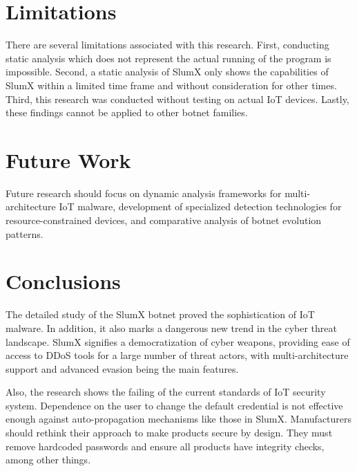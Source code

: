 \documentclass[12pt,letterpaper]{report}
\begin{document}
\section{Limitations}

There are several limitations associated with this research. First, conducting static analysis which does not represent the actual running of the program is impossible. Second, a static analysis of SlumX only shows the capabilities of SlumX within a limited time frame and without consideration for other times. Third, this research was conducted without testing on actual IoT devices. Lastly, these findings cannot be applied to other botnet families.



\section{Future Work}

Future research should focus on dynamic analysis frameworks for multi-architecture IoT malware, development of specialized detection technologies for resource-constrained devices, and comparative analysis of botnet evolution patterns.



\section{Conclusions}

The detailed study of the SlumX botnet proved the sophistication of IoT malware. In addition, it also marks a dangerous new trend in the cyber threat landscape. SlumX signifies a democratization of cyber weapons, providing ease of access to DDoS tools for a large number of threat actors, with multi-architecture support and advanced evasion being the main features.

Also, the research shows the failing of the current standards of IoT security system. Dependence on the user to change the default credential is not effective enough against auto-propagation mechanisms like those in SlumX. Manufacturers should rethink their approach to make products secure by design. They must remove hardcoded passwords and ensure all products have integrity checks, among other things.
\end{document}
